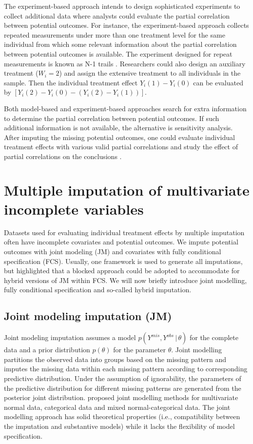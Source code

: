 	The experiment-based approach intends to design sophisticated experiments to collect additional data where analysts could evaluate the partial correlation between potential outcomes. For instance, the experiment-based approach collects repeated measurements under more than one treatment level for the same individual from which some relevant information about the partial correlation between potential outcomes is available. The experiment designed for repeat measurements is known as N-1 trails \citep{shamseer2015consort, araujo2016understanding}. Researchers could also design an auxiliary treatment ($W_{i} = 2$) and assign the extensive treatment to all individuals in the sample. Then the individual treatment effect $Y_{i}(1) - Y_{i}(0)$ can be evaluated by $[Y_{i}(2) - Y_{i}(0) - (Y_{i}(2) - Y_{i}(1))]$. 
	
	Both model-based and experiment-based approaches search for extra information to determine the partial correlation between potential outcomes. If such additional information is not available, the alternative is sensitivity analysis. After imputing the missing potential outcomes, one could evaluate individual treatment effects with various valid partial correlations and study the effect of partial correlations on the conclusions \citep{gadbury2001evaluating}.  
	
	\section{Multiple imputation of multivariate incomplete variables}
	\label{sec:4.3}
	Datasets used for evaluating individual treatment effects by multiple imputation often have incomplete covariates and potential outcomes. We impute potential outcomes with joint modeling (JM) and covariates with fully conditional specification (FCS). Usually, one framework is used to generate all imputations, but \citet{Buuren2018} highlighted that a blocked approach could be adopted to accommodate for hybrid versions of JM within FCS. We will now briefly introduce joint modelling, fully conditional specification and so-called hybrid imputation. 
	\subsection{Joint modeling imputation (JM)}
	Joint modeling imputation assumes a model $p(Y^{mis}, Y^{obs}\,|\,\theta)$ for the complete data and a prior distribution $p(\theta)$ for the parameter $\theta$. Joint modelling partitions the observed data into groups based on the missing pattern and imputes the missing data within each missing pattern according to corresponding predictive distribution. Under the assumption of ignorability, the parameters of the predictive distribution for different missing patterns are generated from the posterior joint distribution. \citet{schafer1997analysis} proposed joint modelling methods for multivariate normal data, categorical data and mixed normal-categorical data. The joint modelling approach has solid theoretical properties (i.e., compatibility between the imputation and substantive models) while it lacks the flexibility of model specification.
	
